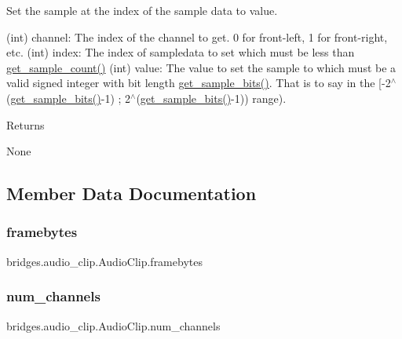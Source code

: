 Set the sample at the index of the sample data to value. 

(int) channel\+: The index of the channel to get. 0 for front-\/left, 1 for front-\/right, etc. (int) index\+: The index of sampledata to set which must be less than \hyperlink{classbridges_1_1audio__clip_1_1_audio_clip_ace0227160e6743e8fd19c803af81d474}{get\+\_\+sample\+\_\+count()} (int) value\+: The value to set the sample to which must be a valid signed integer with bit length \hyperlink{classbridges_1_1audio__clip_1_1_audio_clip_a8dc41d20f5c06e83f7aea326072ef32e}{get\+\_\+sample\+\_\+bits()}. That is to say in the \mbox{[}-\/2$^\wedge$(\hyperlink{classbridges_1_1audio__clip_1_1_audio_clip_a8dc41d20f5c06e83f7aea326072ef32e}{get\+\_\+sample\+\_\+bits()}-\/1) ; 2$^\wedge$(\hyperlink{classbridges_1_1audio__clip_1_1_audio_clip_a8dc41d20f5c06e83f7aea326072ef32e}{get\+\_\+sample\+\_\+bits()}-\/1)) range). \begin{DoxyReturn}{Returns}


None 
\end{DoxyReturn}


\subsection{Member Data Documentation}
\mbox{\label{classbridges_1_1audio__clip_1_1_audio_clip_a8af93e6689978881cc60e7cdf4092ce7}} 
\subsubsection{\texorpdfstring{framebytes}{framebytes}}
{\footnotesize\ttfamily bridges.\+audio\+\_\+clip.\+Audio\+Clip.\+framebytes}

\mbox{\label{classbridges_1_1audio__clip_1_1_audio_clip_ace413dc6646f965e2d0f75e1d84000c9}} 
\subsubsection{\texorpdfstring{num\+\_\+channels}{num\_channels}}
{\footnotesize\ttfamily bridges.\+audio\+\_\+clip.\+Audio\+Clip.\+num\+\_\+channels}

